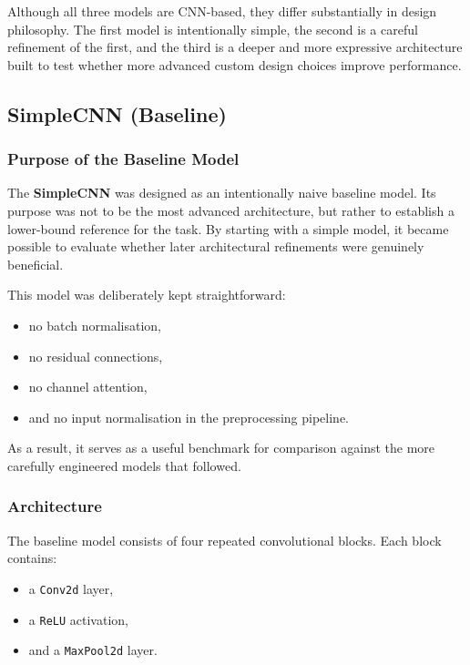 \documentclass{article}
\begin{document}
Although all three models are CNN-based, they differ substantially in design philosophy. The first model is intentionally simple, the second is a careful refinement of the first, and the third is a deeper and more expressive architecture built to test whether more advanced custom design choices improve performance.

\subsection{SimpleCNN (Baseline)}

\subsubsection{Purpose of the Baseline Model}

The \textbf{SimpleCNN} was designed as an intentionally naive baseline model. Its purpose was not to be the most advanced architecture, but rather to establish a lower-bound reference for the task. By starting with a simple model, it became possible to evaluate whether later architectural refinements were genuinely beneficial.

This model was deliberately kept straightforward:
\begin{itemize}
    \item no batch normalisation,
    \item no residual connections,
    \item no channel attention,
    \item and no input normalisation in the preprocessing pipeline.
\end{itemize}

As a result, it serves as a useful benchmark for comparison against the more carefully engineered models that followed.

\subsubsection{Architecture}

The baseline model consists of four repeated convolutional blocks. Each block contains:
\begin{itemize}
    \item a \texttt{Conv2d} layer,
    \item a \texttt{ReLU} activation,
    \item and a \texttt{MaxPool2d} layer.
\end{itemize}
\end{document}
